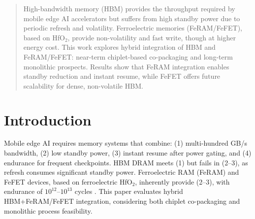 \begin{abstract}
High-bandwidth memory (HBM) provides the throughput required by mobile edge AI accelerators but suffers from high standby power due to periodic refresh and volatility. 
Ferroelectric memories (FeRAM/FeFET), based on HfO$_2$, provide non-volatility and fast write, though at higher energy cost. 
This work explores hybrid integration of HBM and FeRAM/FeFET: near-term chiplet-based co-packaging and long-term monolithic prospects. 
Results show that FeRAM integration enables standby reduction and instant resume, while FeFET offers future scalability for dense, non-volatile HBM.
\end{abstract}

\section{Introduction}
Mobile edge AI requires memory systems that combine:
(1) multi-hundred GB/s bandwidth, 
(2) low standby power, 
(3) instant resume after power gating, 
and (4) endurance for frequent checkpoints.
HBM DRAM meets (1) but fails in (2--3), as refresh consumes significant standby power. 
Ferroelectric RAM (FeRAM) and FeFET devices, based on ferroelectric HfO$_2$, inherently provide (2--3), with endurance of $10^{12}$–$10^{13}$ cycles \cite{MuellerIEDM2012,MartinVLSI2020}. 
This paper evaluates hybrid HBM+FeRAM/FeFET integration, considering both chiplet co-packaging and monolithic process feasibility.
　
